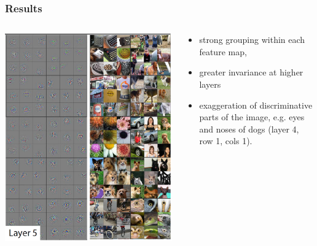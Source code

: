 \begin{frame}
	\frametitle{Results}


	\begin{columns} %
		\begin{column}{.6\textwidth}
		\begin{center}
			\includegraphics[scale=0.5]{figs/ZFnet_layer5}
		\end{center}
		\end{column}%



		\begin{column}{.4\textwidth}


			\bigskip

			\begin{itemize}
				\item strong grouping within each feature map,

				\medskip

				\item greater invariance at higher layers

				\medskip

				\item exaggeration of discriminative parts of the image, e.g. eyes and noses of dogs (layer 4, row 1, cols 1).

			\end{itemize}
		\end{column}%
	\end{columns}





\end{frame}

